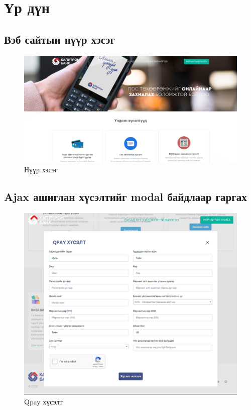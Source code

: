 \section{Үр дүн}
\subsection{Вэб сайтын нүүр хэсэг}

\begin{figure}
	\centering
	\includegraphics[width=15cm]{images/merchant.png}
	\caption{Нүүр хэсэг}
	\label{fig:homepage}
\end{figure}
\pagebreak

\subsection{Ajax ашиглан хүсэлтийг modal байдлаар гаргах}

\begin{figure}
	\centering
	\includegraphics[width=14cm]{images/qpay_form.png}
	\caption{Qpay хүсэлт}
	\label{fig:modalform}
\end{figure}
\pagebreak

